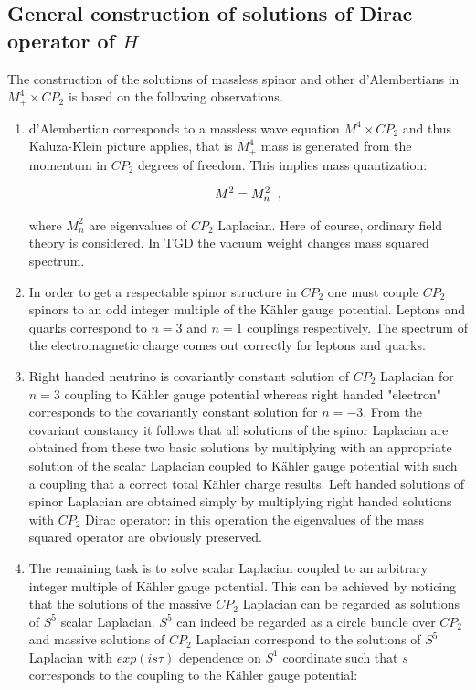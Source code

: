 \documentclass[10pt,epsf]{article}
\begin{document}
\subsection{General construction of solutions of Dirac operator of $H$}

The construction of the  solutions of massless spinor and other d'Alembertians in  $M^4_+\times CP_2$ is based on the following observations.




\begin{enumerate}

\item  d'Alembertian corresponds to a massless wave equation $M^4\times CP_2$ and thus  Kaluza-Klein picture applies, that is  $M^4_+$ mass is generated from the  momentum in  $CP_2$ degrees of freedom. This implies mass quantization:

\begin{eqnarray}
M^2 =M_n^2\hspace{.2cm} ,
\end{eqnarray}


\noindent  where $M_n^2$ are eigenvalues of $CP_2$ Laplacian. Here of course, ordinary field theory is considered. In TGD the vacuum  weight changes mass squared spectrum.


\item In order to get a respectable  spinor structure in $CP_2$ one must couple $CP_2$ spinors to an odd integer multiple of the K\"ahler gauge potential. Leptons and quarks correspond to $n=3$ and $n=1$ couplings respectively.  The spectrum of the electromagnetic charge comes out correctly for leptons and quarks.

\item Right handed neutrino is covariantly constant solution of $CP_2$ Laplacian for $n=3$ coupling to  K\"ahler gauge potential whereas right handed "electron" corresponds to the covariantly constant solution for $n=-3$. From the covariant constancy it follows that all solutions of the spinor Laplacian are obtained from these two basic solutions by multiplying with an appropriate solution of the scalar Laplacian coupled to K\"ahler gauge potential with such a  coupling that  a correct total K\"ahler charge results.  Left handed solutions of spinor Laplacian are obtained simply by multiplying right handed solutions with $CP_2$ Dirac operator: in this operation the eigenvalues of the mass squared operator are obviously preserved.


\item The remaining task is to solve  scalar Laplacian coupled to an arbitrary integer multiple of K\"ahler gauge potential. This can be achieved by noticing that the solutions of the massive $CP_2$ Laplacian can be regarded as solutions of $S^5$ scalar Laplacian. $S^5$ can indeed be regarded as a circle bundle over $CP_2$ and massive solutions of $CP_2$ Laplacian correspond to the solutions  of $S^5$ Laplacian with $exp(is\tau)$ dependence on $S^1$ coordinate such that $s$ corresponds to the coupling to the K\"ahler gauge potential:


\end{enumerate}
\end{document}
